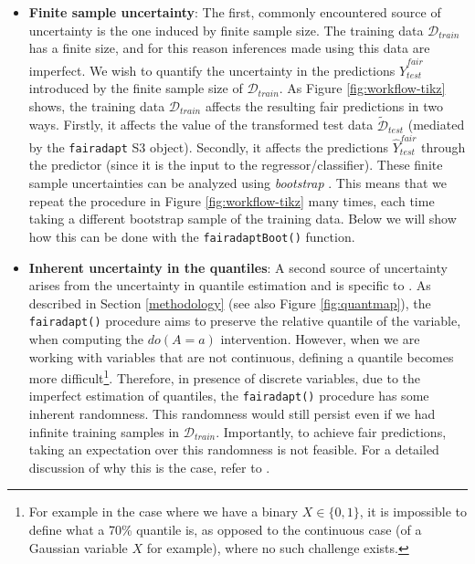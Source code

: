 \documentclass[
  nojss]{jss}
\begin{document}
\begin{itemize}
\item
  \textbf{Finite sample uncertainty}: The first, commonly encountered
  source of uncertainty is the one induced by finite sample size. The
  training data \(\mathcal{D}_{train}\) has a finite size, and for this
  reason inferences made using this data are imperfect. We wish to
  quantify the uncertainty in the predictions
  \(\widehat{Y}^{fair}_{test}\) introduced by the finite sample size of
  \(\mathcal{D}_{train}\). As Figure \ref{fig:workflow-tikz} shows, the
  training data \(\mathcal{D}_{train}\) affects the resulting fair
  predictions in two ways. Firstly, it affects the value of the
  transformed test data \(\widetilde{\mathcal{D}}_{test}\) (mediated by
  the \texttt{fairadapt} S3 object). Secondly, it affects the
  predictions \(\widehat{Y}^{fair}_{test}\) through the predictor (since
  it is the input to the regressor/classifier). These finite sample
  uncertainties can be analyzed using \emph{bootstrap}
  \citep{efron1994introduction}. This means that we repeat the procedure
  in Figure \ref{fig:workflow-tikz} many times, each time taking a
  different bootstrap sample of the training data. Below we will show
  how this can be done with the \texttt{fairadaptBoot()} function.
\item
  \textbf{Inherent uncertainty in the quantiles}: A second source of
  uncertainty arises from the uncertainty in quantile estimation and is
  specific to . As described in Section \ref{methodology}
  (see also Figure \ref{fig:quantmap}), the \texttt{fairadapt()}
  procedure aims to preserve the relative quantile of the variable, when
  computing the \(do(A=a)\) intervention. However, when we are working
  with variables that are not continuous, defining a quantile becomes
  more
  difficult\footnote{For example in the case where we have a binary $X \in \lbrace 0, 1 \rbrace$, it is impossible to define what a 70\% quantile is, as opposed to the continuous case (of a Gaussian variable $X$ for example), where no such challenge exists.}.
  Therefore, in presence of discrete variables, due to the imperfect
  estimation of quantiles, the \texttt{fairadapt()} procedure has some
  inherent randomness. This randomness would still persist even if we
  had infinite training samples in \(\mathcal{D}_{train}\). Importantly,
  to achieve fair predictions, taking an expectation over this
  randomness is not feasible. For a detailed discussion of why this is
  the case, refer to \citep[Section~5]{plecko2020fair}.
\end{itemize}
\end{document}

